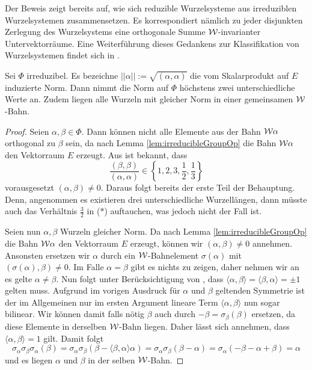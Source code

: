 \begin{bem}
  Der Beweis zeigt bereits auf, wie sich reduzible Wurzelsysteme aus irreduziblen Wurzelsystemen zusammensetzen.
  Es korrespondiert nämlich zu jeder disjunkten Zerlegung des Wurzelsystems eine orthogonale Summe $\mathcal{W}$\hyp{}invarianter Untervektorräume.
  Eine Weiterführung dieses Gedankens zur Klassifikation von Wurzelsystemen findet sich in \cite[S.57ff.]{humphreys1972introduction}.
\end{bem}

\begin{lem}
  \label{lem:rootLength}
  Sei $\Phi$ irreduzibel.
  Es bezeichne $||\alpha|| := \sqrt{(\alpha,\alpha)}$ die vom Skalarprodukt auf $E$ induzierte Norm.
  Dann nimmt die Norm auf $\Phi$ höchstens zwei unterschiedliche Werte an.
  Zudem liegen alle Wurzeln mit gleicher Norm in einer gemeinsamen $\mathcal{W}$\hyp{}Bahn.
\end{lem}

\begin{proof}
  Seien $\alpha, \beta \in \Phi$.
  Dann können nicht alle Elemente aus der Bahn $\mathcal{W}\alpha$ orthogonal zu $\beta$ sein, da nach Lemma \ref{lem:irreducibleGroupOp} die Bahn $\mathcal{W}\alpha$ den Vektorraum $E$ erzeugt.
  Aus \cite[S.45]{humphreys1972introduction} ist bekannt, dass  
  \begin{displaymath}
    \frac{(\beta,\beta)}{(\alpha,\alpha)} \in \left\{1,2,3,\frac{1}{2},\frac{1}{3}\right\} \tag{$\ast$}
  \end{displaymath}
  vorausgesetzt $(\alpha, \beta) \neq 0$.
  Daraus folgt bereits der erste Teil der Behauptung.
  Denn, angenommen es existieren drei unterschiedliche Wurzellängen, dann müsste auch das Verhältnis $\tfrac{3}{2}$ in ($\ast$) auftauchen, was jedoch nicht der Fall ist.

  Seien nun $\alpha, \beta$ Wurzeln gleicher Norm.
  Da nach Lemma \ref{lem:irreducibleGroupOp} die Bahn $\mathcal{W}\alpha$ den Vektorraum $E$ erzeugt, können wir $(\alpha, \beta) \neq 0$ annehmen.
  Ansonsten ersetzen wir $\alpha$ durch ein $\mathcal{W}$\hyp{}Bahnelement $\sigma(\alpha)$ mit $(\sigma(\alpha), \beta) \neq 0$.
  Im Falle $\alpha = \beta$ gibt es nichts zu zeigen, daher nehmen wir an es gelte $\alpha \neq \beta$.
  Nun folgt unter Berücksichtigung von \cite[S.45]{humphreys1972introduction}, dass $\langle \alpha, \beta \rangle = \langle \beta, \alpha \rangle = \pm 1$ gelten muss.
  Aufgrund im vorigen Ausdruck für $\alpha$ und $\beta$ geltenden Symmetrie ist der im Allgemeinen nur im ersten Argument lineare Term $\langle \alpha, \beta \rangle$ nun sogar bilinear.
  Wir können damit falls nötig $\beta$ auch durch $-\beta = \sigma_\beta(\beta)$ ersetzen, da diese Elemente in derselben $\mathcal{W}$\hyp{}Bahn liegen.
  Daher lässt sich annehmen, dass $\langle \alpha, \beta \rangle = 1$ gilt.
  Damit folgt
  \begin{displaymath}
    \sigma_\alpha \sigma_\beta \sigma_\alpha(\beta) 
    = \sigma_\alpha \sigma_\beta(\beta - \langle \beta, \alpha \rangle \alpha)
    = \sigma_\alpha \sigma_\beta(\beta - \alpha)
    = \sigma_\alpha (-\beta - \alpha + \beta)
    = \alpha
  \end{displaymath}
  und es liegen $\alpha$ und $\beta$ in der selben $\mathcal{W}$\hyp{}Bahn.
\end{proof} 

